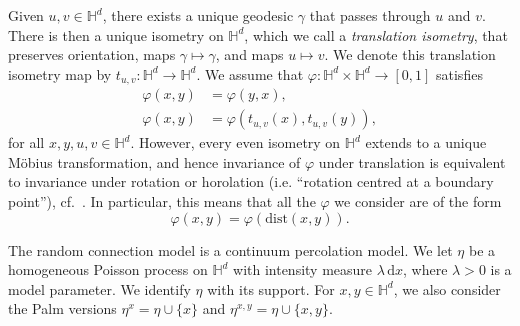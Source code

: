\documentclass[10pt,a4paper,dvipsnames]{article}
\theoremstyle{definition}
\theoremstyle{remark}
\newcommand{\HypDim}{{\mathbb{H}^d}}
\newcommand{\dd}{\mathrm{d}} %
\newcommand{\dist}[1]{\mathrm{dist}\left(#1\right)}
\newcommand{\connf}{\varphi}
\numberwithin{equation}{section}
\begin{document}
Given $u,v\in\HypDim$, there exists a unique geodesic $\gamma$ that passes through $u$ and $v$. There is then a unique isometry on $\HypDim$, which we call a \emph{translation isometry}, that preserves orientation, maps $\gamma\mapsto\gamma$, and maps $u\mapsto v$. We denote this translation isometry map by $t_{u,v}\colon\HypDim\to\HypDim$. We assume that $\connf\colon \HypDim\times\HypDim\to \left[0,1\right]$ satisfies
\begin{align}
    \connf(x,y) &= \connf(y,x),\\
    \label{eq:translInv}
    \connf(x,y) &= \connf\left(t_{u,v}(x),t_{u,v}(y)\right),
\end{align}
for all $x,y,u,v\in\HypDim$.
However, every even isometry on $\HypDim$ extends to a unique Möbius transformation, and hence invariance of $\connf$ under translation is equivalent to invariance under rotation  or horolation (i.e. ``rotation centred at a boundary point''), cf.~\cite[Exercise~29.13]{martin2012foundations}. In particular, this means that all the $\connf$ we consider are of the form
\begin{equation*}
    \connf(x,y) = \connf\left(\dist{x,y}\right).
\end{equation*}


\medskip
The random connection model is a continuum percolation model. We let $\eta$ be a homogeneous Poisson process on $\HypDim$ with intensity measure $
\lambda \,\dd x$, where $\lambda>0$ is a model parameter. We identify $\eta$ with its support. 
For $x,y\in\HypDim$, we also consider the Palm versions $\eta^x=\eta\cup\{x\}$ and $\eta^{x,y}=\eta\cup\{x,y\}$. 
\end{document}
